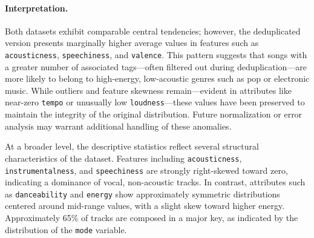 \documentclass{article}
\begin{document}
\begin{table}[H]
\centering
{}
\caption{Sample of matched emotion labels with track metadata. Each row represents a unique song associated with one or more emotion labels.}
\label{tab:sample_emotion_table}
\end{table}


\paragraph{Interpretation.}
Both datasets exhibit comparable central tendencies; however, the deduplicated version presents marginally higher average values in features such as \texttt{acousticness}, \texttt{speechiness}, and \texttt{valence}. This pattern suggests that songs with a greater number of associated tags—often filtered out during deduplication—are more likely to belong to high-energy, low-acoustic genres such as pop or electronic music. While outliers and feature skewness remain—evident in attributes like near-zero \texttt{tempo} or unusually low \texttt{loudness}—these values have been preserved to maintain the integrity of the original distribution. Future normalization or error analysis may warrant additional handling of these anomalies.

At a broader level, the descriptive statistics reflect several structural characteristics of the dataset. Features including \texttt{acousticness}, \texttt{instrumentalness}, and \texttt{speechiness} are strongly right-skewed toward zero, indicating a dominance of vocal, non-acoustic tracks. In contrast, attributes such as \texttt{danceability} and \texttt{energy} show approximately symmetric distributions centered around mid-range values, with a slight skew toward higher energy. Approximately 65\% of tracks are composed in a major key, as indicated by the distribution of the \texttt{mode} variable.
\end{document}
